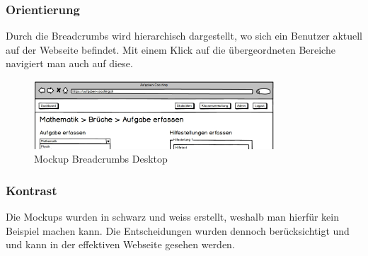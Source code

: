 \subsubsection*{Orientierung} 
Durch die Breadcrumbs wird hierarchisch dargestellt, wo sich ein Benutzer aktuell auf der Webseite befindet. Mit einem Klick auf die übergeordneten Bereiche navigiert man auch auf diese. \\

\begin{minipage}{\textwidth}
	\begin{figure}[H]
	\centering
		\includegraphics[width=0.8\textwidth, keepaspectratio]{images/Mockups/Breadcrumbs_Desktop.png}
		\caption{Mockup Breadcrumbs Desktop}
	\end{figure}
\end{minipage}


\subsubsection*{Kontrast}
Die Mockups wurden in schwarz und weiss erstellt, weshalb man hierfür kein Beispiel machen kann. Die Entscheidungen wurden dennoch berücksichtigt und  und kann in der effektiven Webseite gesehen werden.


\newpage